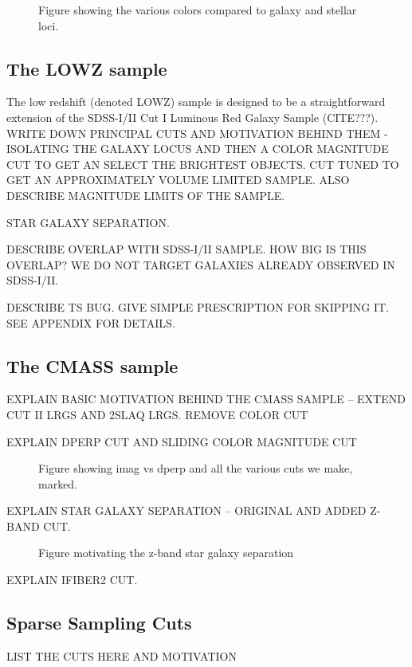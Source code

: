 \documentclass[iop,apj]{emulateapj}
\begin{document}
\begin{figure}
\caption{Figure showing the various colors compared to galaxy and stellar loci.}
\label{fig:color}
\end{figure}

\subsection{The LOWZ sample}

The low redshift (denoted LOWZ) sample is designed to be a straightforward
extension of the SDSS-I/II Cut I Luminous Red Galaxy Sample (CITE???).
WRITE DOWN PRINCIPAL CUTS AND MOTIVATION BEHIND THEM - ISOLATING THE GALAXY
LOCUS AND THEN A COLOR MAGNITUDE CUT TO GET AN SELECT THE BRIGHTEST OBJECTS. 
CUT TUNED TO GET AN APPROXIMATELY VOLUME LIMITED SAMPLE. ALSO DESCRIBE MAGNITUDE
LIMITS OF THE SAMPLE.

STAR GALAXY SEPARATION.

DESCRIBE OVERLAP WITH SDSS-I/II SAMPLE. HOW BIG IS THIS OVERLAP? WE DO NOT
TARGET GALAXIES ALREADY OBSERVED IN SDSS-I/II.

DESCRIBE TS BUG. GIVE SIMPLE PRESCRIPTION FOR SKIPPING IT. SEE APPENDIX FOR
DETAILS.

\subsection{The CMASS sample}

EXPLAIN BASIC MOTIVATION BEHIND THE CMASS SAMPLE -- EXTEND CUT II LRGS AND 2SLAQ
LRGS. REMOVE COLOR CUT

EXPLAIN DPERP CUT AND SLIDING COLOR MAGNITUDE CUT

\begin{figure}
\caption{Figure showing imag vs dperp and all the various cuts we make, marked.}
\end{figure}

EXPLAIN STAR GALAXY SEPARATION -- ORIGINAL AND ADDED Z-BAND CUT.

\begin{figure}
\caption{Figure motivating the z-band star galaxy separation}
\end{figure}

EXPLAIN IFIBER2 CUT.

\subsection{Sparse Sampling Cuts}

LIST THE CUTS HERE AND MOTIVATION
\end{document}
